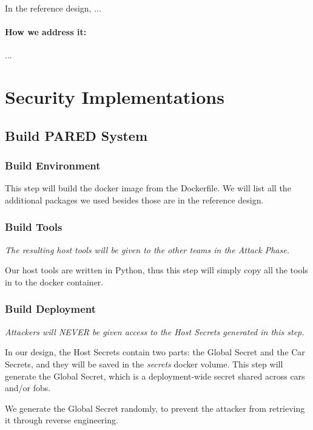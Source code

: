 \documentclass[11pt,oneside,onecolumn,letterpaper]{article}
\begin{document}
In the reference design, ...

\paragraph{How we address it:} ...



\section{Security Implementations}



\subsection{Build PARED System}

\subsubsection{Build Environment}

This step will build the docker image from the Dockerfile. We will list all the additional packages we used besides those are in the reference design.

\subsubsection{Build Tools}

\textit{The resulting host tools will be given to the other teams in the Attack Phase.}

Our host tools are written in Python, thus this step will simply copy all the tools in to the docker container.

\subsubsection{Build Deployment}

\textit{Attackers will NEVER be given access to the Host Secrets generated in this step.}

In our design, the Host Secrets contain two parts: the Global Secret and the Car Secrets, and they will be saved in the \textit{secrets} docker volume.
This step will generate the Global Secret, which is a deployment-wide secret shared across cars and/or fobs.

We generate the Global Secret randomly, to prevent the attacker from retrieving it through reverse engineering.
\end{document}
